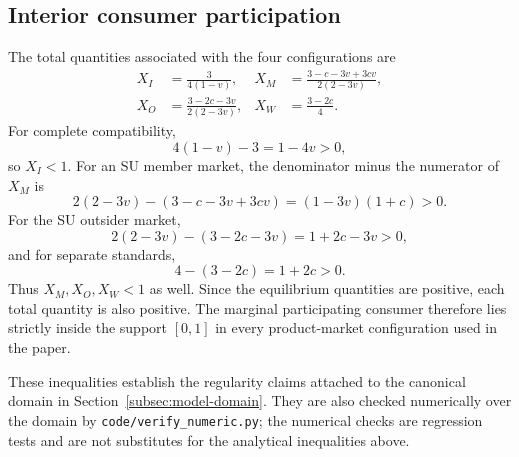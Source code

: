 \subsection{Interior consumer participation}

The total quantities associated with the four configurations are
\begin{align}
X_I&=\frac{3}{4(1-v)},&
X_M&=\frac{3-c-3v+3cv}{2(2-3v)},\\
X_O&=\frac{3-2c-3v}{2(2-3v)},&
X_W&=\frac{3-2c}{4}.
\end{align}
For complete compatibility,
\[
4(1-v)-3=1-4v>0,
\]
so $X_I<1$. For an SU member market, the denominator minus the numerator of $X_M$ is
\[
2(2-3v)-(3-c-3v+3cv)
=(1-3v)(1+c)>0.
\]
For the SU outsider market,
\[
2(2-3v)-(3-2c-3v)
=1+2c-3v>0,
\]
and for separate standards,
\[
4-(3-2c)=1+2c>0.
\]
Thus $X_M,X_O,X_W<1$ as well. Since the equilibrium quantities are positive, each total quantity is also positive. The marginal participating consumer therefore lies strictly inside the support $[0,1]$ in every product-market configuration used in the paper.

These inequalities establish the regularity claims attached to the canonical domain in Section~\ref{subsec:model-domain}. They are also checked numerically over the domain by \texttt{code/verify\_numeric.py}; the numerical checks are regression tests and are not substitutes for the analytical inequalities above.
